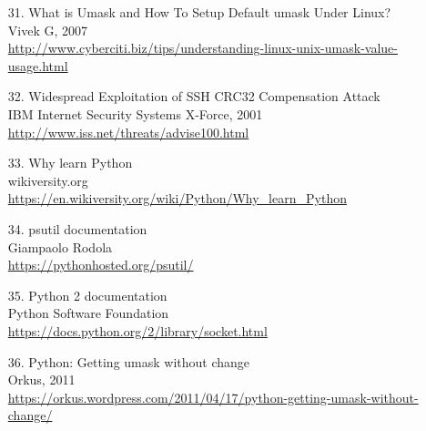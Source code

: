 \documentclass[a4paper,12pt]{article}
\begin{document}
\begin{sloppypar}
\begin{enumerate}
\item [31.] What is Umask and How To Setup Default umask Under Linux? \\ 
	Vivek G, 2007 \\
	\url{http://www.cyberciti.biz/tips/understanding-linux-unix-umask-value-usage.html}
\item [32.] Widespread Exploitation of SSH CRC32 Compensation Attack \\ 
	IBM Internet Security Systems X-Force, 2001 \\
	\url{http://www.iss.net/threats/advise100.html}
\item [33.] Why learn Python \\ 
	wikiversity.org \\
	\url{https://en.wikiversity.org/wiki/Python/Why\_learn\_Python}
\item [34.] psutil documentation \\ 
	Giampaolo Rodola \\
	\url{https://pythonhosted.org/psutil/}
\item [35.] Python 2 documentation \\ 
	Python Software Foundation \\
	\url{https://docs.python.org/2/library/socket.html}
\item [36.] Python: Getting umask without change \\ 
	Orkus, 2011 \\
	\url{https://orkus.wordpress.com/2011/04/17/python-getting-umask-without-change/}
\end{enumerate}



\end{sloppypar}
\end{document}

